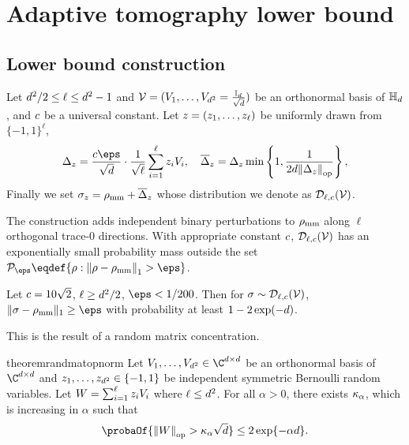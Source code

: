 \section{Adaptive tomography lower bound}
\subsection{Lower bound construction}
\begin{definition}
 \label{def:perturbation}
     Let $d^2/2\le\ell\le d^2-1$ and ${\mathcal{V}}=(V_1, \ldots, V_{d^2}=\frac{\mathbb{I}_d}{\sqrt{d}})$ be an orthonormal basis of ${\mathbb{H}_{d}}$, and ${c}$ be a universal constant. Let  ${z}=({z}_1, \ldots, {z}_\ell)$ be uniformly drawn from $\{-1, 1\}^\ell$,
     \begin{equation}
         \Delta_{\ptb} = \frac{\cd\eps}{\sqrt{\dims}}\cdot\frac{1}{\sqrt{\ell}}\sum_{i=1}^\ell \ptb_iV_i, \quad \barDelta_{\ptb}= \Delta_{\ptb}\min\left\{1, \frac{1}{2\dims \opnorm{\Delta_{\ptb}}}\right\},
         \label{equ:delta_z}
     \end{equation}
     Finally we set $\sigma_{{z}}={\rho_{\text{mm}}} + {\overline{\Delta}}_{{z}}$ whose distribution we denote as ${\mathcal{D}_{\ell,{c}}}({\mathcal{V}})$.
 \end{definition}

The construction adds independent binary perturbations to ${\rho_{\text{mm}}}$ along $\ell$ orthogonal trace-0 directions. With appropriate constant ${c}$, ${\mathcal{D}_{\ell,{c}}}({\mathcal{V}})$ has an exponentially small probability mass outside the set $\mathcal{P}_\eps\eqdef\{\rho: \tracenorm{\rho-\qmm}>\eps\}$.
\begin{theorem}
\label{prop:perturbation-trace-distance}
    Let ${c}= 10\sqrt{2}$, $\ell\ge d^2/2$, $\eps<1/200$. Then for $\sigma\sim {\mathcal{D}_{\ell,{c}}}({\mathcal{V}})$,  $\|\sigma-\qmm\|_1\ge \eps$ with probability at least $1-2\exp(-d)$. 
\end{theorem}

This is the result of a random matrix concentration.
\begin{restatable}{theorem}{randmatopnorm}
\label{thm:rand-mat-opnorm-concentration}
    Let $V_1, \ldots, V_{\dims^2}\in\C^{\dims\times \dims}$ be an orthonormal basis of $\C^{\dims\times \dims}$ and ${z}_1, \ldots, {z}_{d^2}\in\{-1, 1\}$ be independent symmetric Bernoulli random variables. Let $W=\sum_{i=1}^{\ell}{z}_iV_i$ where $\ell\le d^2$. For all $\alpha>0$, there exists $\kappa_\alpha$, {which is increasing in $\alpha$} such that
    \[
    \probaOf{\opnorm{W}>\cop_\alpha\sqrt{\dims}}\le 2\exp\{-\alpha\dims\}.
    \]
\end{restatable}

